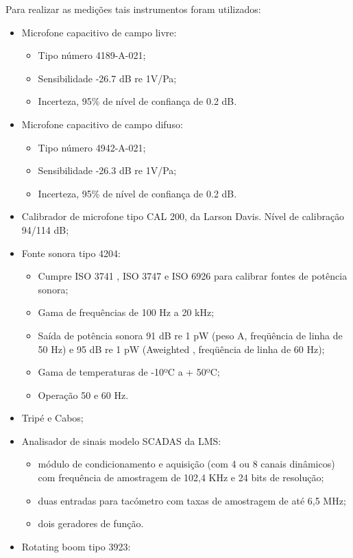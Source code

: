 Para realizar as medições tais instrumentos foram utilizados:
\begin{itemize}
	\item Microfone capacitivo de campo livre:
		\begin{itemize}
			\item Tipo número 4189-A-021;
			\item Sensibilidade -26.7 dB re 1V/Pa;
			\item Incerteza, 95\% de nível de confiança de 0.2 dB.
		\end{itemize}
	\item Microfone capacitivo de campo difuso:
		\begin{itemize}
			\item Tipo número 4942-A-021;
			\item Sensibilidade -26.3 dB re 1V/Pa;
			\item Incerteza, 95\% de nível de confiança de 0.2 dB.
		\end{itemize}
	\item Calibrador de microfone tipo CAL 200, da Larson Davis. Nível de calibração 94/114 dB;
	\item Fonte sonora tipo 4204:
		\begin{itemize}
			\item Cumpre ISO 3741 , ISO 3747 e ISO 6926 para calibrar fontes de potência sonora;
			\item Gama de frequências de 100 Hz a 20 kHz;
			\item Saída de potência sonora 91 dB re 1 pW (peso A, freqüência de linha de 50 Hz) e 95 dB re 1 pW (Aweighted , freqüência de linha de 60 Hz);
			\item Gama de temperaturas de -10ºC a + 50ºC;
			\item Operação 50 e 60 Hz.
		\end{itemize}
	\item Tripé e Cabos;
	\item Analisador de sinais modelo SCADAS da LMS:
	\begin{itemize}
		\item módulo de condicionamento e aquisição (com 4 ou 8 canais dinâmicos) com frequência de amostragem de 102,4 KHz e 24 bits de resolução;
		\item duas entradas para tacómetro com taxas de amostragem de até 6,5 MHz;
		\item dois geradores de função.
	\end{itemize}
	\item Rotating boom tipo 3923:

\end{itemize}

